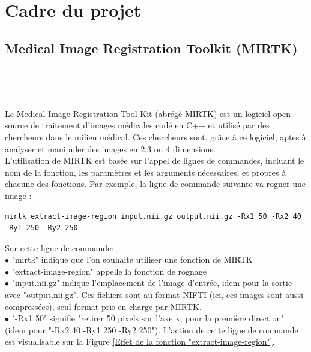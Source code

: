 \documentclass[10pt]{report}
\begin{document}
	\section{Cadre du projet} 
	\subsection{Medical Image Registration Toolkit (MIRTK)}~\par~\par
	Le Medical Image Registration Tool-Kit (abrégé MIRTK) est un logiciel open-source de traitement d'images médicales codé en C++ et utilisé par des chercheurs dans le milieu médical. Ces chercheurs sont, grâce à ce logiciel, aptes à analyser et manipuler des images en 2,3 ou 4 dimensions. \\ 
	L'utilisation de MIRTK est basée sur l'appel de lignes de commandes, incluant le nom de la fonction, les paramètres et les arguments nécessaires, et propres à chacune des fonctions. Par exemple, la ligne de commande suivante va rogner une image :
	
	\begin{lstlisting}
mirtk extract-image-region input.nii.gz output.nii.gz -Rx1 50 -Rx2 40 -Ry1 250 -Ry2 250
	\end{lstlisting}
	
	Sur cette ligne de commande:
	\\{$\bullet$} "mirtk" indique que l'on souhaite utiliser une fonction de MIRTK
	\\{$\bullet$} "extract-image-region" appelle la fonction de rognage
	\\{$\bullet$} "input.nii.gz" indique l'emplacement de l'image d'entrée, idem pour la sortie avec "output.nii.gz". Ces fichiers sont au format NIFTI (ici, ces images sont aussi compressées), seul format pris en charge par MIRTK.
	\\{$\bullet$} "-Rx1 50" signifie "retirer 50 pixels sur l'axe x, pour la première direction" (idem pour "-Rx2 40 -Ry1 250 -Ry2 250"). 
	L'action de cette ligne de commande est visualisable sur la Figure \ref{Effet de la fonction "extract-image-region"}.
	
\end{document}
